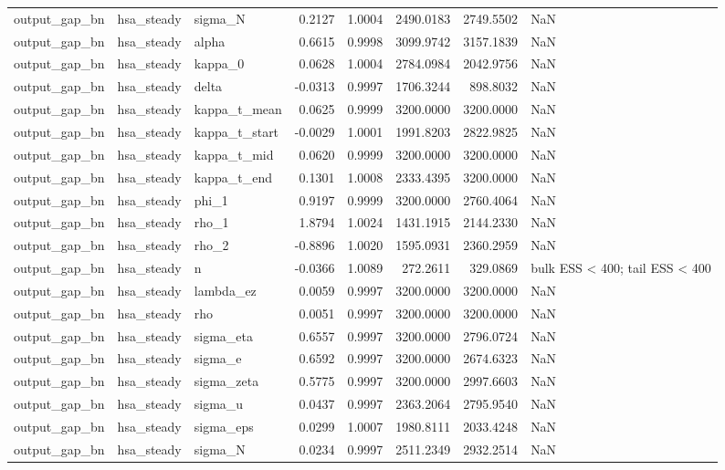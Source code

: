 \begin{tabular}{lllrrrrl}
output\_gap\_bn & hsa\_steady & sigma\_N & 0.2127 & 1.0004 & 2490.0183 & 2749.5502 & NaN \\
output\_gap\_bn & hsa\_steady & alpha & 0.6615 & 0.9998 & 3099.9742 & 3157.1839 & NaN \\
output\_gap\_bn & hsa\_steady & kappa\_0 & 0.0628 & 1.0004 & 2784.0984 & 2042.9756 & NaN \\
output\_gap\_bn & hsa\_steady & delta & -0.0313 & 0.9997 & 1706.3244 & 898.8032 & NaN \\
output\_gap\_bn & hsa\_steady & kappa\_t\_mean & 0.0625 & 0.9999 & 3200.0000 & 3200.0000 & NaN \\
output\_gap\_bn & hsa\_steady & kappa\_t\_start & -0.0029 & 1.0001 & 1991.8203 & 2822.9825 & NaN \\
output\_gap\_bn & hsa\_steady & kappa\_t\_mid & 0.0620 & 0.9999 & 3200.0000 & 3200.0000 & NaN \\
output\_gap\_bn & hsa\_steady & kappa\_t\_end & 0.1301 & 1.0008 & 2333.4395 & 3200.0000 & NaN \\
output\_gap\_bn & hsa\_steady & phi\_1 & 0.9197 & 0.9999 & 3200.0000 & 2760.4064 & NaN \\
output\_gap\_bn & hsa\_steady & rho\_1 & 1.8794 & 1.0024 & 1431.1915 & 2144.2330 & NaN \\
output\_gap\_bn & hsa\_steady & rho\_2 & -0.8896 & 1.0020 & 1595.0931 & 2360.2959 & NaN \\
output\_gap\_bn & hsa\_steady & n & -0.0366 & 1.0089 & 272.2611 & 329.0869 & bulk ESS < 400; tail ESS < 400 \\
output\_gap\_bn & hsa\_steady & lambda\_ez & 0.0059 & 0.9997 & 3200.0000 & 3200.0000 & NaN \\
output\_gap\_bn & hsa\_steady & rho & 0.0051 & 0.9997 & 3200.0000 & 3200.0000 & NaN \\
output\_gap\_bn & hsa\_steady & sigma\_eta & 0.6557 & 0.9997 & 3200.0000 & 2796.0724 & NaN \\
output\_gap\_bn & hsa\_steady & sigma\_e & 0.6592 & 0.9997 & 3200.0000 & 2674.6323 & NaN \\
output\_gap\_bn & hsa\_steady & sigma\_zeta & 0.5775 & 0.9997 & 3200.0000 & 2997.6603 & NaN \\
output\_gap\_bn & hsa\_steady & sigma\_u & 0.0437 & 0.9997 & 2363.2064 & 2795.9540 & NaN \\
output\_gap\_bn & hsa\_steady & sigma\_eps & 0.0299 & 1.0007 & 1980.8111 & 2033.4248 & NaN \\
output\_gap\_bn & hsa\_steady & sigma\_N & 0.0234 & 0.9997 & 2511.2349 & 2932.2514 & NaN \\

\end{tabular}
